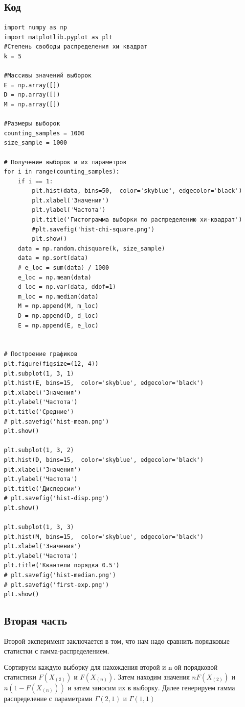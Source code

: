 \documentclass{article}
\begin{document}
\subsection{Код}\label{subsec:}
\begin{verbatim}
import numpy as np
import matplotlib.pyplot as plt
#Степень свободы распределения хи квадрат
k = 5

#Массивы значений выборок
E = np.array([])
D = np.array([])
M = np.array([])

#Размеры выборок
counting_samples = 1000
size_sample = 1000

# Получение выборок и их параметров
for i in range(counting_samples):
    if i == 1:
        plt.hist(data, bins=50,  color='skyblue', edgecolor='black')
        plt.xlabel('Значения')
        plt.ylabel('Частота')
        plt.title('Гистограмма выборки по распределению хи-квадрат')
        #plt.savefig('hist-chi-square.png')
        plt.show()
    data = np.random.chisquare(k, size_sample)
    data = np.sort(data)
    # e_loc = sum(data) / 1000
    e_loc = np.mean(data)
    d_loc = np.var(data, ddof=1)
    m_loc = np.median(data)
    M = np.append(M, m_loc)
    D = np.append(D, d_loc)
    E = np.append(E, e_loc)


# Построение графиков
plt.figure(figsize=(12, 4))
plt.subplot(1, 3, 1)
plt.hist(E, bins=15,  color='skyblue', edgecolor='black')
plt.xlabel('Значения')
plt.ylabel('Частота')
plt.title('Средние')
# plt.savefig('hist-mean.png')
plt.show()

plt.subplot(1, 3, 2)
plt.hist(D, bins=15,  color='skyblue', edgecolor='black')
plt.xlabel('Значения')
plt.ylabel('Частота')
plt.title('Дисперсии')
# plt.savefig('hist-disp.png')
plt.show()

plt.subplot(1, 3, 3)
plt.hist(M, bins=15,  color='skyblue', edgecolor='black')
plt.xlabel('Значения')
plt.ylabel('Частота')
plt.title('Квантели порядка 0.5')
# plt.savefig('hist-median.png')
# plt.savefig('first-exp.png')
plt.show()
\end{verbatim}


\subsection{Вторая часть}\label{subsec:---}
Второй эксперимент заключается в том, что нам надо сравнить порядковые статистки с гамма-распределением.

Сортируем каждую выборку для нахождения второй и n-ой порядковой статистики $F(X_{(2)})$ и $F(X_{(n)})$.
Затем находим значения $nF(X_{(2)})$ и $n(1 - F(X_{(n)}))$ и затем заносим их в выборку.
Далее генерируем гамма распределение с параметрами $\Gamma(2, 1)$ и $\Gamma(1, 1)$
\end{document}
